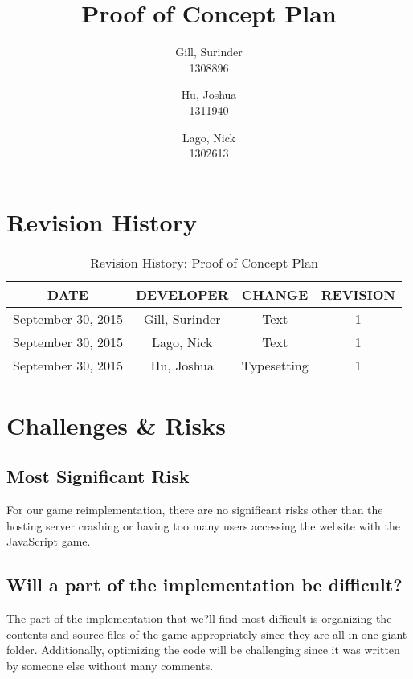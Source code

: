 \documentclass[11pt, oneside]{article}   	%
\title{Proof of Concept Plan}
\author{Gill, Surinder\\
		1308896
		\and
		Hu, Joshua\\
		1311940
		\and
		Lago, Nick\\
		1302613}
\begin{document}
\maketitle
\thispagestyle{empty}

\newpage
\marginpar{}
\section*{Revision History}

\begin{table}[hp]
\caption{Revision History: Proof of Concept Plan}
\begin{center}
\label{tab:}
\begin{tabular}{|c|c|c|c|}
\hline
\textbf{DATE} & \textbf{DEVELOPER} & \textbf{CHANGE} & \textbf{REVISION}\\
\hline
September 30, 2015 & Gill, Surinder & Text & 1\\
\hline
September 30, 2015 & Lago, Nick & Text & 1\\
\hline
September 30, 2015 & Hu, Joshua & Typesetting & 1\\
\hline
\end{tabular}
\end{center}
\label{default}
\end{table}%


\newpage

\section*{Challenges \& Risks}
\subsection*{Most Significant Risk}

For our game reimplementation, there are no significant risks other than the hosting server crashing or having too many users accessing the website with the JavaScript game.

\subsection*{Will a part of the implementation be difficult?}

The part of the implementation that we?ll find most difficult is organizing the contents and source files of the game appropriately since they are all in one giant folder. Additionally, optimizing the code will be challenging since it was written by someone else without many comments. 
\end{document}
